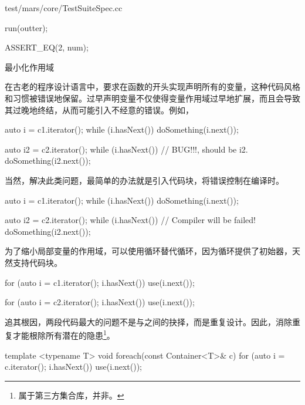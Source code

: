 \begin{content}
\begin{nodiff}{test/mars/core/TestSuiteSpec.cc}
\begin{c++}
{  run(outter);

  ASSERT_EQ(2, num);
} 
\end{c++}
\end{nodiff}

\begin{episode}{最小化作用域}

\begin{content}

在古老的程序设计语言中，要求在函数的开头实现声明所有的变量，这种代码风格和习惯被错误地保留。过早声明变量不仅使得变量作用域过早地扩展，而且会导致其过晚地终结，从而可能引入不经意的错误。例如，

 \begin{c++}[title={\ttfamily{while循环}}]
auto i = c1.iterator();
while (i.hasNext()) {
  doSomething(i.next());
}

auto i2 = c2.iterator();
while (i.hasNext()) {           // BUG!!!, should be i2.
  doSomething(i2.next());
}
 \end{c++}

当然，解决此类问题，最简单的办法就是引入代码块，将错误控制在编译时。

 \begin{c++}[title={\ttfamily{while循环}}]
{
  auto i = c1.iterator();
  while (i.hasNext()) {
    doSomething(i.next());
  }
}

{
  auto i2 = c2.iterator();
  while (i.hasNext()) {           // Compiler will be failed!
    doSomething(i2.next());
  }
}
 \end{c++}

为了缩小局部变量的作用域，可以使用循环替代循环，因为循环提供了初始器，天然支持代码块。

 \begin{c++}[title={\ttfamily{for循环}}]
for (auto i = c1.iterator(); i.hasNext()) {
  use(i.next());
}

for (auto i = c2.iterator(); i.hasNext()) {
  use(i.next());
}
 \end{c++}

追其根因，两段代码最大的问题不是与之间的抉择，而是重复设计。因此，消除重复才能根除所有潜在的隐患\footnote{属于第三方集合库，并非。}。

 \begin{c++}[title={\ttfamily{for循环}}]
template <typename T>
void foreach(const Container<T>& c) {
  for (auto i = c.iterator(); i.hasNext()) {
    use(i.next());
  } 
}
 \end{c++}


\end{content}
\end{episode}
\end{content}
